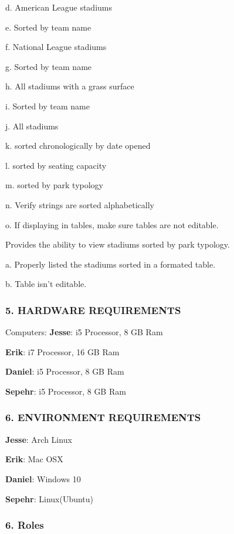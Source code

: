 \begin{DoxyEnumerate}
d. American League stadiums

e. Sorted by team name

f. National League stadiums

g. Sorted by team name

h. All stadiums with a grass surface

i. Sorted by team name

j. All stadiums

k. sorted chronologically by date opened

l. sorted by seating capacity

m. sorted by park typology

n. Verify strings are sorted alphabetically

o. If displaying in tables, make sure tables are not editable.
\item Provides the ability to view stadiums sorted by park typology.

a. Properly listed the stadiums sorted in a formated table.

b. Table isn’t editable.
\end{DoxyEnumerate}

\subsubsection*{5. H\+A\+R\+D\+W\+A\+RE R\+E\+Q\+U\+I\+R\+E\+M\+E\+N\+TS}

Computers\+: {\bfseries Jesse}\+: i5 Processor, 8 GB Ram

{\bfseries Erik}\+: i7 Processor, 16 GB Ram

{\bfseries Daniel}\+: i5 Processor, 8 GB Ram

{\bfseries Sepehr}\+: i5 Processor, 8 GB Ram

\subsubsection*{6. E\+N\+V\+I\+R\+O\+N\+M\+E\+NT R\+E\+Q\+U\+I\+R\+E\+M\+E\+N\+TS}

{\bfseries Jesse}\+: Arch Linux

{\bfseries Erik}\+: Mac O\+SX

{\bfseries Daniel}\+: Windows 10

{\bfseries Sepehr}\+: Linux(\+Ubuntu)

\subsubsection*{6. Roles}

